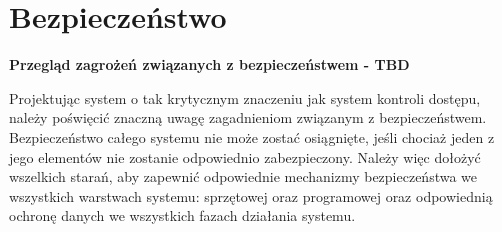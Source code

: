 	\section{Bezpieczeństwo}
		\textbf{Przegląd zagrożeń związanych z bezpieczeństwem - TBD}

		Projektując system o tak krytycznym znaczeniu jak system kontroli dostępu, należy poświęcić znaczną uwagę zagadnieniom związanym z bezpieczeństwem. Bezpieczeństwo całego systemu nie może zostać osiągnięte, jeśli chociaż jeden z jego elementów nie zostanie odpowiednio zabezpieczony. Należy więc dołożyć wszelkich starań, aby zapewnić odpowiednie mechanizmy bezpieczeństwa we wszystkich warstwach systemu: sprzętowej oraz programowej oraz odpowiednią ochronę danych we wszystkich fazach działania systemu.




